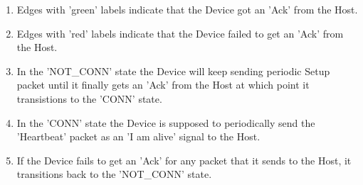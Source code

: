 \begin{enumerate} 
\item Edges with 'green' labels indicate that the Device got an 'Ack' from the Host.
\item Edges with 'red' labels indicate that the Device failed to get an 'Ack' from the Host.
\item In the 'NOT\_CONN' state the Device will keep sending periodic Setup packet until it finally gets an 'Ack' from the Host at which point it transistions to the 'CONN' state.
\item In the 'CONN' state the Device is supposed to periodically send the 'Heartbeat' packet as an 'I am alive' signal to the Host.
\item If the Device fails to get an 'Ack' for any packet that it sends to the Host, it transitions back to the 'NOT\_CONN' state.
\end{enumerate}

